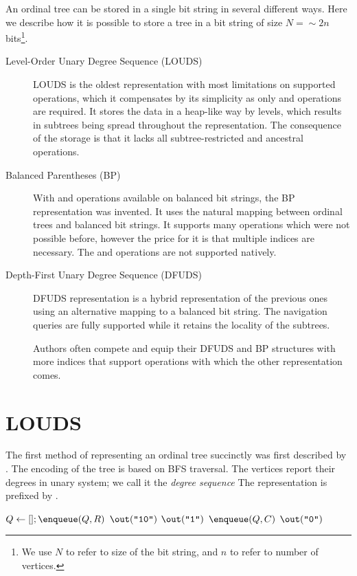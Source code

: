 An ordinal tree can be stored in a single bit string in several different ways.
Here we describe how it is possible to store a tree in a bit string of size $N = \sim 2n$ bits\footnote{
	We use $N$ to refer to size of the bit string, and $n$ to refer to number of vertices.
}.
\begin{description}
	\item[Level-Order Unary Degree Sequence (LOUDS)]
	LOUDS is the oldest representation with most limitations on supported operations, which it compensates by its simplicity as only \rank{} and \select{} operations are required.
	It stores the data in a heap-like way by levels, which results in subtrees being spread throughout the representation.
	The consequence of the storage is that it lacks all subtree-restricted and ancestral operations.
	
	\item[Balanced Parentheses (BP)]
	With \match{} and \enclose{} operations available on balanced bit strings, the BP representation was invented.
	It uses the natural mapping between ordinal trees and balanced bit strings.
	It supports many operations which were not possible before, however the price for it is that multiple indices are necessary.
	The \childRank{} and \childSelect{} operations are not supported natively.
	
	\item[Depth-First Unary Degree Sequence (DFUDS)]
	DFUDS representation is a hybrid representation of the previous ones using an alternative mapping to a balanced bit string.
	The navigation queries are fully supported while it retains the locality of the subtrees.
	
	Authors often compete and equip their DFUDS and BP structures with more indices that support operations with which the other representation comes.
\end{description}

\section{LOUDS}

The first method of representing an ordinal tree succinctly was first described by \cite{jacobson1989space}.
The encoding of the tree is based on BFS traversal.
The vertices report their degrees in unary system; we call it the \emph{degree sequence}
The representation is prefixed by .

\begin{algorithm}
\begin{algorithmic}
	\State $Q \gets []; \enqueue(Q, R)$ 
	\State $\out(\str{10})$
			\State $\out(\str1)$
			\State $\enqueue(Q, C)$
		\EndFor
		\State $\out(\str0)$
	\EndWhile
\EndFunction
\end{algorithmic}
\end{algorithm}

